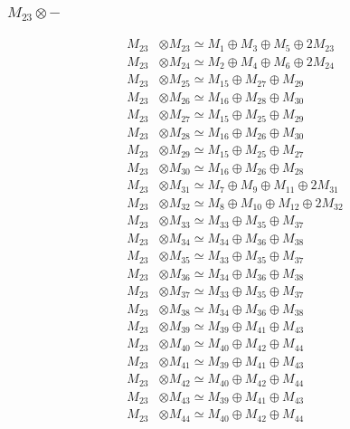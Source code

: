 \subsubsection{$ M_{23}\otimes -$}
\begin{align*}
M_{23} &\otimes M_{23} \simeq M_{1} \oplus M_{3} \oplus M_{5} \oplus 2M_{23} \\
M_{23} &\otimes M_{24} \simeq M_{2} \oplus M_{4} \oplus M_{6} \oplus 2M_{24} \\
M_{23} &\otimes M_{25} \simeq M_{15} \oplus M_{27} \oplus M_{29} \\
M_{23} &\otimes M_{26} \simeq M_{16} \oplus M_{28} \oplus M_{30} \\
M_{23} &\otimes M_{27} \simeq M_{15} \oplus M_{25} \oplus M_{29} \\
M_{23} &\otimes M_{28} \simeq M_{16} \oplus M_{26} \oplus M_{30} \\
M_{23} &\otimes M_{29} \simeq M_{15} \oplus M_{25} \oplus M_{27} \\
M_{23} &\otimes M_{30} \simeq M_{16} \oplus M_{26} \oplus M_{28} \\
M_{23} &\otimes M_{31} \simeq M_{7} \oplus M_{9} \oplus M_{11} \oplus 2M_{31} \\
M_{23} &\otimes M_{32} \simeq M_{8} \oplus M_{10} \oplus M_{12} \oplus 2M_{32} \\
M_{23} &\otimes M_{33} \simeq M_{33} \oplus M_{35} \oplus M_{37} \\
M_{23} &\otimes M_{34} \simeq M_{34} \oplus M_{36} \oplus M_{38} \\
M_{23} &\otimes M_{35} \simeq M_{33} \oplus M_{35} \oplus M_{37} \\
M_{23} &\otimes M_{36} \simeq M_{34} \oplus M_{36} \oplus M_{38} \\
M_{23} &\otimes M_{37} \simeq M_{33} \oplus M_{35} \oplus M_{37} \\
M_{23} &\otimes M_{38} \simeq M_{34} \oplus M_{36} \oplus M_{38} \\
M_{23} &\otimes M_{39} \simeq M_{39} \oplus M_{41} \oplus M_{43} \\
M_{23} &\otimes M_{40} \simeq M_{40} \oplus M_{42} \oplus M_{44} \\
M_{23} &\otimes M_{41} \simeq M_{39} \oplus M_{41} \oplus M_{43} \\
M_{23} &\otimes M_{42} \simeq M_{40} \oplus M_{42} \oplus M_{44} \\
M_{23} &\otimes M_{43} \simeq M_{39} \oplus M_{41} \oplus M_{43} \\
M_{23} &\otimes M_{44} \simeq M_{40} \oplus M_{42} \oplus M_{44} \\

\end{align*}
